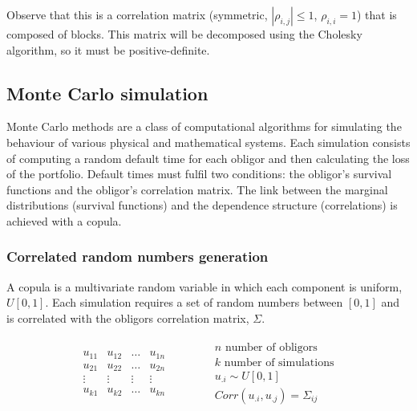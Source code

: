 \documentclass[a4paper,12pt,final]{article}
\begin{document}
Observe that this is a correlation matrix (symmetric, $|\rho_{i,j}| \leq 1$, 
$\rho_{i,i} = 1$) that is composed of blocks. This matrix will be decomposed 
using the Cholesky algorithm, so it must be positive-definite.

\subsection{Monte Carlo simulation}
\label{mcsim}
Monte Carlo methods are a class of computational algorithms for 
simulating the behaviour of various physical and mathematical systems. 
Each simulation consists of computing a random default time for each obligor 
and then calculating the loss of the portfolio. Default times must fulfil two 
conditions: the obligor's survival functions and the obligor's correlation 
matrix. The link between the marginal distributions (survival functions) and 
the dependence structure (correlations) is achieved with a copula.

\subsubsection{Correlated random numbers generation}
A copula \cite{copu:pitfalls} \cite{copu:wang} is a multivariate random variable 
in which each component is uniform, $U[0,1]$. Each simulation requires a set of 
random numbers between $[0, 1]$ and is correlated with the obligors correlation 
matrix, $\Sigma$.

\begin{displaymath}
\begin{array}{ccc}
\begin{array}{|c|c|c|c|}
u_{11} & u_{12} & \dots  & u_{1n} \\
u_{21} & u_{22} & \dots  & u_{2n} \\
\vdots & \vdots & \vdots & \vdots \\
u_{k1} & u_{k2} & \dots  & u_{kn} \\
\end{array}
&
\qquad
&
\begin{array}{c}
n \textrm{ number of obligors}    \\
k \textrm{ number of simulations}  \\
u_{.i} \sim U[0,1]                 \\
Corr(u_{.i}, u_{.j}) = \Sigma_{ij} \\
\end{array}
\end{array}
\end{displaymath}
\end{document}
